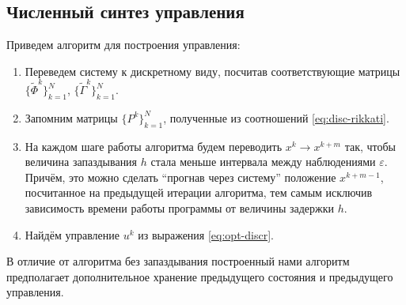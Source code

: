 \subsection{Численный синтез управления}

Приведем алгоритм для построения управления:
\begin{enumerate}
        \item Переведем систему к дискретному виду, посчитав соответствующие матрицы 
        $\{\tilde \Phi^k\}_{k=1}^{N}$, $\{\tilde \Gamma^k\}_{k=1}^{N}$.

        \item Запомним матрицы $\{P^k\}_{k=1}^N$, полученные из соотношений \eqref{eq:disc-rikkati}.

        \item На каждом шаге работы алгоритма будем переводить $x^k \longrightarrow x^{k+m}$ так, чтобы величина запаздывания $h$ стала меньше интервала между наблюдениями $\varepsilon$. Причём, это можно сделать ``прогнав через систему'' положение $x^{k+m-1}$, посчитанное на предыдущей итерации алгоритма, тем самым исключив зависимость времени работы программы от величины задержки $h$.

        \item Найдём управление $u^k$ из выражения \eqref{eq:opt-discr}.
\end{enumerate}
В отличие от алгоритма без запаздывания построенный нами алгоритм предполагает дополнительное хранение предыдущего состояния и предыдущего управления.